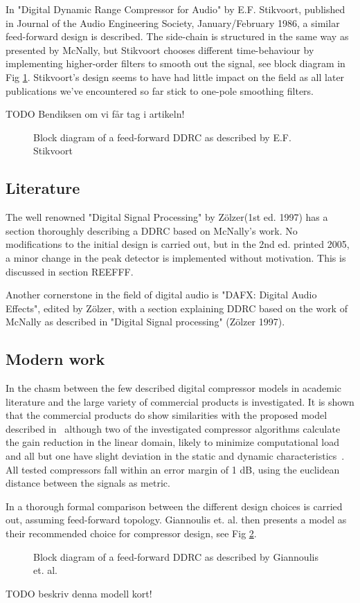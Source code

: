 \documentclass[]{article}
\begin{document}
In "Digital Dynamic Range Compressor for Audio" by E.F. Stikvoort, published in  Journal of the Audio Engineering Society, January/February 1986, a similar feed-forward design is described. The side-chain is structured in the same way as presented by McNally, but Stikvoort chooses different time-behaviour by implementing higher-order filters to smooth out the signal, see block diagram in Fig \ref{fig:stikvoortBlock}. Stikvoort's design seems to have had little impact on the field as all later publications we've encountered so far stick to one-pole smoothing filters.

TODO Bendiksen om vi får tag i artikeln!

\begin{figure}
\caption{Block diagram of a feed-forward DDRC as described by E.F. Stikvoort}
\label{fig:stikvoortBlock}
\end{figure}

\subsection*{Literature}
The well renowned "Digital Signal Processing" by Zölzer(1st ed. 1997) has a section thoroughly describing a DDRC based on McNally's work. No modifications to the initial design is carried out, but in the 2nd ed. printed 2005, a minor change in the peak detector is implemented without motivation. This is discussed in section REEFFF.

Another cornerstone in the field of digital audio is "DAFX: Digital Audio Effects", edited by Zölzer, with a section explaining DDRC based on the work of McNally as described in "Digital Signal processing" (Zölzer 1997).

\subsection*{Modern work}
In \cite{bitzer2006parameter} the chasm between the few described digital compressor models in academic literature and the large variety of commercial products is investigated. It is shown that the commercial products do show similarities with the proposed model described in~\cite{mcnally1984dynamic}\cite{zolzer1997digital}\cite{dafx} although two of the investigated compressor algorithms calculate the gain reduction in the linear domain, likely to minimize computational load and all but one have slight deviation in the static and dynamic characteristics~\cite{bitzer2006parameter}. All tested compressors fall within an error margin of 1 dB, using the euclidean distance between the signals as metric.

In \cite{reiss2012tutorial} a thorough formal comparison between the different design choices is carried out, assuming feed-forward topology. Giannoulis et. al.  then presents a model as their recommended choice for compressor design, see Fig \ref{fig:gian_ddrc_block}.
\begin{figure}
\caption{Block diagram of a feed-forward DDRC as described by Giannoulis et. al.}
\label{fig:gian_ddrc_block}
\end{figure}

TODO beskriv denna modell kort!


\end{document}
